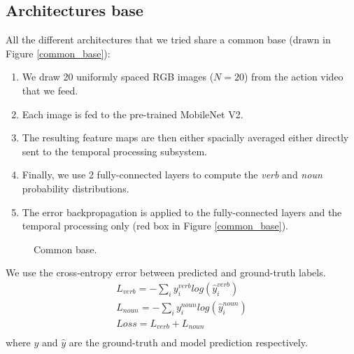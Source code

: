 \documentclass[12pt, a4paper]{report}
\begin{document}
			\subsection{Architectures base}
				All the different architectures that we tried share a common base (drawn in Figure \ref{common_base}):
				\begin{enumerate}
					\item We draw 20 uniformly spaced RGB images ($N=20$) from the action video that we feed.
					\item Each image is fed to the pre-trained MobileNet V2.
					\item The resulting feature maps are then either spacially averaged either directly sent to the temporal processing subsystem.
					\item Finally, we use 2 fully-connected layers to compute the {\itshape verb} and {\itshape noun} probability distributions.
					\item The error backpropagation is applied to the fully-connected layers and the temporal processing only (red box in Figure \ref{common_base}).
				\end{enumerate}
				\begin{figure}[h!]
					\centering
					\caption{Common base.}
				\end{figure}
				We use the cross-entropy error between predicted and ground-truth labels.
				\begin{align*}
					L_{verb} = -\sum_{i} y^{verb}_{i}log(\hat{y}^{verb}_{i}) \\
					L_{noun} = -\sum_{i} y^{noun}_{i}log(\hat{y}^{noun}_{i}) \\
					Loss = L_{verb} + L_{noun} \\
				\end{align*}
				where $y$ and $\hat{y}$ are the ground-truth and model prediction respectively.
\end{document}
